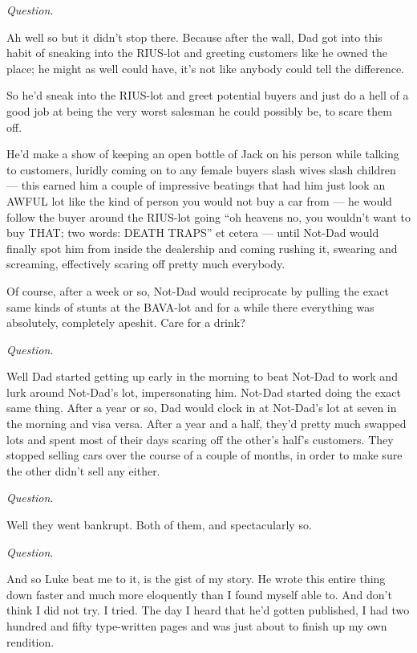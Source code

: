 {\em Question}.



Ah well so but it didn't stop there. Because after the wall,
Dad got into this habit of sneaking into the RIUS-lot and greeting
customers like he owned the place; he might as well could have,
it's not like anybody could tell the difference.

So he'd sneak into the RIUS-lot and greet potential buyers
and just do a hell of a good job at being the very worst salesman
he could possibly be, to scare them off.

He'd make a show of keeping an open bottle of Jack on his
person while talking to customers, luridly coming on to any female
buyers slash wives slash children --- this earned him a couple
of impressive beatings that had him just look an AWFUL lot like the
kind of person you would not buy a car from --- he would follow
the buyer around the RIUS-lot going ``oh heavens no, you
wouldn't want to buy THAT; two words: DEATH TRAPS'' et
cetera --- until Not-Dad would finally spot him from inside the
dealership and coming rushing it, swearing and screaming,
effectively scaring off pretty much everybody.

Of course, after a week or so, Not-Dad would reciprocate by pulling
the exact same kinds of stunts at the BAVA-lot and for a while
there everything was absolutely, completely apeshit. Care for a
drink?



{\em Question}.



Well Dad started getting up early in the morning to beat Not-Dad to
work and lurk around Not-Dad's lot, impersonating him.
Not-Dad started doing the exact same thing. After a year or so, Dad
would clock in at Not-Dad's lot at seven in the morning and
visa versa. After a year and a half, they'd pretty much
swapped lots and spent most of their days scaring off the other's
half's customers. They stopped selling cars over the course of a
couple of months, in order to make sure the other didn't sell any
either.



{\em Question}.



Well they went bankrupt. Both of them, and spectacularly so.



{\em Question}.



And so Luke beat me to it, is the gist of my story. He wrote this
entire thing down faster and much more eloquently than I found
myself able to. And don't think I did not try. I tried. The
day I heard that he'd gotten published, I had two hundred and
fifty type-written pages and was just about to finish up my own
rendition.



